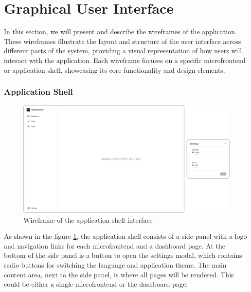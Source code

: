 \section{Graphical User Interface}
In this section, we will present and describe the wireframes of the application. These wireframes illustrate the layout and structure of the user interface across different parts of the system, providing a visual representation of how users will interact with the application. Each wireframe focuses on a specific microfrontend or application shell, showcasing its core functionality and design elements.
\subsubsection*{Application Shell}
\begin{figure}[h]
    \centerline{\includegraphics[width=1\textwidth]{images/wireframes/application-shell.png}}
    \caption[Application shell wireframe]{Wireframe of the application shell interface}
    \label{fig:shell-wireframe} 
\end{figure}
As shown in the figure \ref{fig:shell-wireframe}, the application shell consists of a side panel with a logo and navigation links for each microfrontend and a dashboard page. At the bottom of the side panel is a button to open the settings modal, which contains radio buttons for switching the language and application theme. The main content area, next to the side panel, is where all pages will be rendered. This could be either a single microfrontend or the dashboard page.

